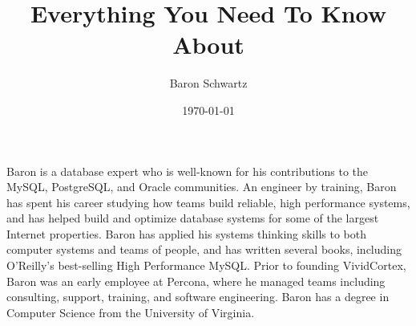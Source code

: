 \documentclass{vivid_layout_pdf}
\title{Everything You Need To Know About}{Scalability}
\date{\today}
\author{Baron Schwartz}{img/baron}
\begin{document}
\maketitle		%
\begin{bio}		%
Baron is a database expert who is well-known for his contributions to the MySQL, PostgreSQL, and Oracle communities. An engineer by training, Baron has spent his career studying how teams build reliable, high performance systems, and has helped build and optimize database systems for some of the largest Internet properties. Baron has applied his systems thinking skills to both computer systems and teams of people, and has written several books, including O'Reilly's best-selling High Performance MySQL. Prior to founding VividCortex, Baron was an early employee at Percona, where he managed teams including consulting, support, training, and software engineering. Baron has a degree in Computer Science from the University of Virginia.
\end{bio}
\tableofcontents	%
\end{document}
